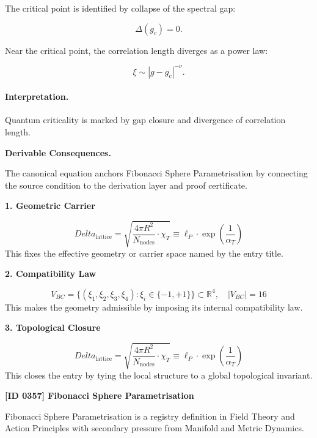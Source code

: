 The critical point is identified by collapse of the spectral gap:

\begin{equation}
\Delta(g_c)=0 .
\end{equation}

Near the critical point, the correlation length diverges as a power law:

\begin{equation}
\boxed{
\xi \sim |g-g_c|^{-\nu}.
}
\end{equation}

\paragraph{Interpretation.}
Quantum criticality is marked by gap closure and divergence of correlation length.

\par\vspace{0.35em}
\noindent\textbf{Derivable Consequences.}\quad
\begingroup
\footnotesize
\raggedright
The canonical equation anchors Fibonacci Sphere Parametrisation by connecting the source condition to the derivation layer and proof certificate.
\par\endgroup

\noindent\textbf{1. Geometric Carrier}\par
\[
Delta_{\text{lattice}} = \sqrt{\frac{4\pi R^2}{N_{\text{nodes}}} \cdot \chi_T} \equiv \ell_P \cdot \exp\left( \frac{1}{\alpha_T} \right)
\]
\noindent This fixes the effective geometry or carrier space named by the entry title.\par
\noindent\textbf{2. Compatibility Law}\par
\[
V_{BC} = \{ (\xi_1, \xi_2, \xi_3, \xi_4) : \xi_i \in \{ -1, +1 \} \} \subset \mathbb{R}^4, \quad |V_{BC}| = 16
\]
\noindent This makes the geometry admissible by imposing its internal compatibility law.\par
\noindent\textbf{3. Topological Closure}\par
\[
Delta_{\text{lattice}} = \sqrt{\frac{4\pi R^2}{N_{\text{nodes}}} \cdot \chi_T} \equiv \ell_P \cdot \exp\left( \frac{1}{\alpha_T} \right)
\]
\noindent This closes the entry by tying the local structure to a global topological invariant.\par

\clearpage
\noindent\textbf{[ID 0357] Fibonacci Sphere Parametrisation}\par
\vspace{0.35em}
\begingroup\small
{}
Fibonacci Sphere Parametrisation is a registry definition in Field Theory and Action Principles with secondary pressure from Manifold and Metric Dynamics.

